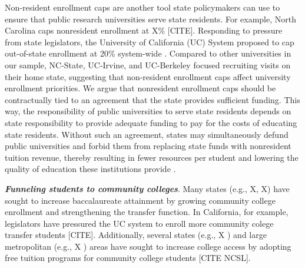 \documentclass[twoside]{article}
\begin{document}
Non-resident enrollment caps are another tool state policymakers can use to ensure that public research universities serve state residents.  For example, North Carolina caps nonresident enrollment at X\% [CITE].  Responding to pressure from state legislators, the  University of California (UC) System proposed to cap out-of-state enrollment at 20\% system-wide \citep{RN4247}.  Compared to other universities in our sample, NC-State, UC-Irvine, and UC-Berkeley focused recruiting visits on their home state, suggesting that non-resident enrollment caps affect university enrollment priorities. We argue that nonresident enrollment caps should be contractually tied to an agreement that the state provides sufficient funding. This way, the responsibility of public universities to serve state residents depends on state responsibility to provide adequate funding to pay for the costs of educating state residents.  Without such an agreement, states may simultaneously defund public universities and forbid them from replacing state funds with nonresident tuition revenue, thereby resulting in fewer resources per student and lowering the quality of education these institutions provide \citep{RN532}.

\textbf{\textit{Funneling students to community colleges}}. Many states (e.g., X, X) have sought to increase baccalaureate attainment by growing community college enrollment and strengthening the transfer function. In California, for example, legislators have pressured the UC system to enroll more community colege transfer students [CITE]. Additionally, several states (e.g., X ) and large metropolitan (e.g., X ) areas have sought to increase college access by adopting free tuition programs for community college students [CITE NCSL].  
\end{document}
